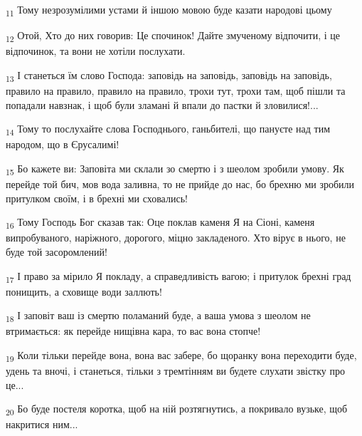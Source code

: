 \begin{tcolorbox}
\textsubscript{11} Тому незрозумілими устами й іншою мовою буде казати народові цьому
\end{tcolorbox}
\begin{tcolorbox}
\textsubscript{12} Отой, Хто до них говорив: Це спочинок! Дайте змученому відпочити, і це відпочинок, та вони не хотіли послухати.
\end{tcolorbox}
\begin{tcolorbox}
\textsubscript{13} І станеться їм слово Господа: заповідь на заповідь, заповідь на заповідь, правило на правило, правило на правило, трохи тут, трохи там, щоб пішли та попадали навзнак, і щоб були зламані й впали до пастки й зловилися!...
\end{tcolorbox}
\begin{tcolorbox}
\textsubscript{14} Тому то послухайте слова Господнього, ганьбителі, що пануєте над тим народом, що в Єрусалимі!
\end{tcolorbox}
\begin{tcolorbox}
\textsubscript{15} Бо кажете ви: Заповіта ми склали зо смертю і з шеолом зробили умову. Як перейде той бич, мов вода заливна, то не прийде до нас, бо брехню ми зробили притулком своїм, і в брехні ми сховались!
\end{tcolorbox}
\begin{tcolorbox}
\textsubscript{16} Тому Господь Бог сказав так: Оце поклав каменя Я на Сіоні, каменя випробуваного, наріжного, дорогого, міцно закладеного. Хто вірує в нього, не буде той засоромлений!
\end{tcolorbox}
\begin{tcolorbox}
\textsubscript{17} І право за мірило Я покладу, а справедливість вагою; і притулок брехні град понищить, а сховище води заллють!
\end{tcolorbox}
\begin{tcolorbox}
\textsubscript{18} І заповіт ваш із смертю поламаний буде, а ваша умова з шеолом не втримається: як перейде нищівна кара, то вас вона стопче!
\end{tcolorbox}
\begin{tcolorbox}
\textsubscript{19} Коли тільки перейде вона, вона вас забере, бо щоранку вона переходити буде, удень та вночі, і станеться, тільки з тремтінням ви будете слухати звістку про це...
\end{tcolorbox}
\begin{tcolorbox}
\textsubscript{20} Бо буде постеля коротка, щоб на ній розтягнутись, а покривало вузьке, щоб накритися ним...
\end{tcolorbox}
